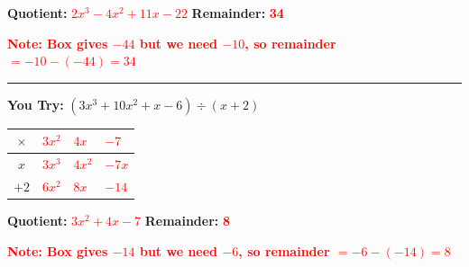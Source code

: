 \documentclass[14pt]{extarticle}
\newcommand{\ans}[1]{\textcolor{red}{\textbf{#1}}}
\begin{document}
\vspace{0.1cm}
\textbf{Quotient:} \ans{$2x^3 - 4x^2 + 11x - 22$} \hfill \textbf{Remainder:} \ans{34}

{\small \ans{Note: Box gives $-44$ but we need $-10$, so remainder $= -10 - (-44) = 34$}}

\vspace{0.2cm}
\hrule
\vspace{0.3cm}

\textbf{You Try:} \quad $(3x^3 + 10x^2 + x - 6) \div (x + 2)$

\vspace{0.2cm}
\begin{center}
\renewcommand{\arraystretch}{2.5}
\large
\begin{tabular}{|c||p{0.8in}|p{0.8in}|p{0.8in}|}
\hline
$\times$ & \ans{$3x^2$} & \ans{$4x$} & \ans{$-7$} \\
\hline\hline
$x$ & \ans{$3x^3$} & \ans{$4x^2$} & \ans{$-7x$} \\
\hline
$+2$ & \ans{$6x^2$} & \ans{$8x$} & \ans{$-14$} \\
\hline
\end{tabular}
\end{center}

\vspace{0.1cm}
\textbf{Quotient:} \ans{$3x^2 + 4x - 7$} \hfill \textbf{Remainder:} \ans{8}

{\small \ans{Note: Box gives $-14$ but we need $-6$, so remainder $= -6 - (-14) = 8$}}
\end{document}
